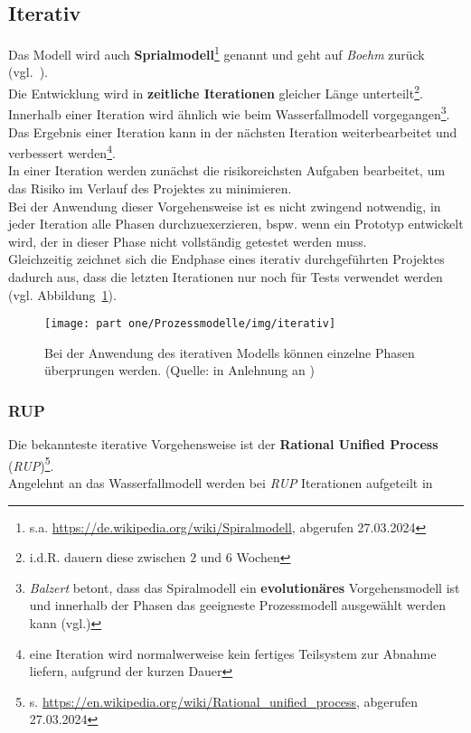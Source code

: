 
\subsection{Iterativ}

Das Modell wird auch \textbf{Sprialmodell}\footnote{
    s.a. \url{https://de.wikipedia.org/wiki/Spiralmodell}, abgerufen 27.03.2024
} genannt und geht auf \textit{Boehm} zurück (vgl.~\cite[]{Boe88}).\\

\noindent
Die Entwicklung wird in \textbf{zeitliche Iterationen} gleicher Länge unterteilt\footnote{
    i.d.R. dauern diese zwischen $2$ und $6$ Wochen
}.\\
Innerhalb einer Iteration wird ähnlich wie beim Wasserfallmodell vorgegangen\footnote{
\textit{Balzert} betont, dass das Spiralmodell ein \textbf{evolutionäres} Vorgehensmodell ist und innerhalb der Phasen das geeigneste Prozessmodell ausgewählt werden kann (vgl.\cite[556]{Bal08})
}.\\
Das Ergebnis einer Iteration kann in der nächsten Iteration weiterbearbeitet und verbessert werden\footnote{
    eine Iteration wird normalwerweise kein fertiges Teilsystem zur Abnahme liefern, aufgrund der kurzen Dauer
}.\\
In einer Iteration werden zunächst die risikoreichsten Aufgaben bearbeitet, um das Risiko im Verlauf des Projektes zu minimieren.\\

\noindent
Bei der Anwendung dieser Vorgehensweise ist es nicht zwingend notwendig, in jeder Iteration alle Phasen  durchzuexerzieren, bspw. wenn ein Prototyp entwickelt wird, der in dieser Phase nicht vollständig getestet werden muss.\\
Gleichzeitig zeichnet sich die Endphase eines iterativ durchgeführten Projektes dadurch aus, dass die letzten Iterationen nur noch für Tests verwendet werden (vgl. Abbildung~\ref{fig:iterativ}).

\begin{figure}
    \centering
    \texttt{[image: part one/Prozessmodelle/img/iterativ]}
    \caption{Bei der Anwendung des iterativen Modells können einzelne Phasen überprungen werden. (Quelle: in Anlehnung an \cite[28, Abb. 3.3]{Wed09})}
    \label{fig:iterativ}
\end{figure}

\subsubsection*{RUP}
Die bekannteste iterative Vorgehensweise ist der \textbf{Rational Unified Process} (\textit{RUP})\footnote{
    s. \url{https://en.wikipedia.org/wiki/Rational_unified_process}, abgerufen 27.03.2024
}.\\
Angelehnt an das Wasserfallmodell werden bei \textit{RUP} Iterationen aufgeteilt in

